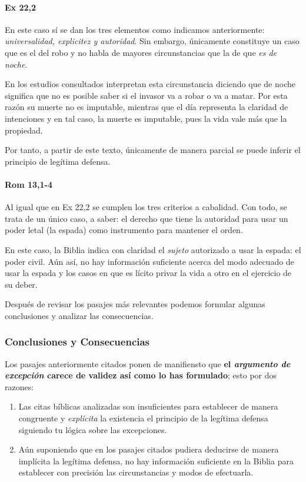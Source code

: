\documentclass{article}
\begin{document}
\paragraph{Ex 22,2}

En este caso s\'{i} se dan los tres elementos como indicamos anteriormente: \emph{universalidad, explicitez y autoridad}. Sin embargo, \'unicamente constituye un caso que es el del robo y no habla de mayores circunstancias que la de que \emph{es de noche}.

En los estudios consultados interpretan esta circunstancia diciendo que de noche significa que no es posible saber si el invasor va a robar o va a matar. Por esta raz\'on su muerte no es imputable, mientras que el d\'{i}a representa la claridad de intenciones y en tal caso, la muerte es imputable, pues la vida vale m\'as que la propiedad.

Por tanto, a partir de este texto, \'unicamente de manera parcial se puede inferir el principio de leg\'{i}tima defensa.

\paragraph{Rom 13,1-4}

Al igual que en Ex 22,2 se cumplen los tres criterios a cabalidad. Con todo, se trata de un \'unico caso, a saber: el derecho que tiene la autoridad para usar un poder letal (la espada) como instrumento para mantener el orden.

En este caso, la Biblia indica con claridad el \emph{sujeto} autorizado a usar la espada: el poder civil. A\'un as\'{i}, no hay informaci\'on suficiente acerca del modo adecuado de usar la espada y los casos en que es l\'{i}cito privar la vida a otro en el ejercicio de su deber.

Despu\'es de revisar los pasajes m\'as relevantes podemos formular algunas conclusiones y analizar las consecuencias.

\subsubsection{Conclusiones y Consecuencias}

Los pasajes anteriormente citados ponen de manifiensto que \textbf{el \emph{argumento de excepci\'on} carece de validez as\'{i} como lo has formulado}; esto por dos razones:

\begin{enumerate}
\item Las citas b\'{i}blicas analizadas son insuficientes para establecer de manera congruente y \emph{expl\'{i}cita} la existencia el principio de la leg\'{i}tima defensa siguiendo tu l\'ogica sobre las excepciones.
\item A\'un suponiendo que en los pasajes citados pudiera deducirse de manera impl\'{i}cita la leg\'{i}tima defensa, no hay informaci\'on suficiente en la Biblia para establecer con precisi\'on las circunstancias y modos de efectuarla.
\end{enumerate}
\end{document}
